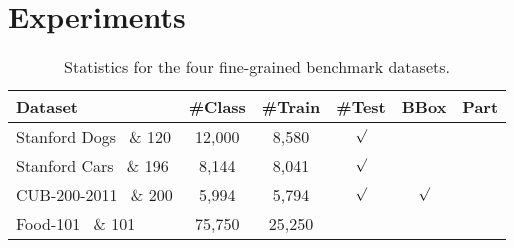 \documentclass[10pt,twocolumn,letterpaper]{article}
\begin{document}



\section{Experiments}

\begin{table}[t]
\begin{center}
\addtolength{\tabcolsep}{2.5pt}
\begin{tabular}{l c c c c c}
\toprule[0.2 em]
Dataset & \#Class & \#Train & \#Test & BBox & Part \\
\toprule[0.2 em]
Stanford Dogs~\cite{khosla2011novel} \& 120 & 12,000  &  8,580 & $\surd$ &    \\
Stanford Cars~\cite{krause20133d} \& 196 & 8,144  & 8,041 & $\surd$ &  \\
CUB-200-2011~\cite{wah2011caltech} \& 200 & 5,994 & 5,794 & $\surd$ & $\surd$ \\
Food-101~\cite{bossard2014food} \& 101 & 75,750 & 25,250 & $ $ & $ $ \\
\bottomrule[0.1 em]
\end{tabular}
\vspace{1pt}
\caption{Statistics for the four fine-grained benchmark datasets.}
\label{tab:statistics}
\end{center}
\end{table}
\end{document}
